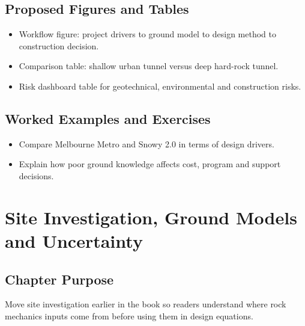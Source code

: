 \documentclass[12pt,oneside]{book}
\begin{document}
\section{Proposed Figures and Tables}
\begin{itemize}
    \item Workflow figure: project drivers to ground model to design method to construction decision.
    \item Comparison table: shallow urban tunnel versus deep hard-rock tunnel.
    \item Risk dashboard table for geotechnical, environmental and construction risks.
\end{itemize}

\section{Worked Examples and Exercises}
\begin{itemize}
    \item Compare Melbourne Metro and Snowy 2.0 in terms of design drivers.
    \item Explain how poor ground knowledge affects cost, program and support decisions.
\end{itemize}

\chapter{Site Investigation, Ground Models and Uncertainty}

\section{Chapter Purpose}
Move site investigation earlier in the book so readers understand where rock mechanics inputs come from before using them in design equations.
\end{document}
